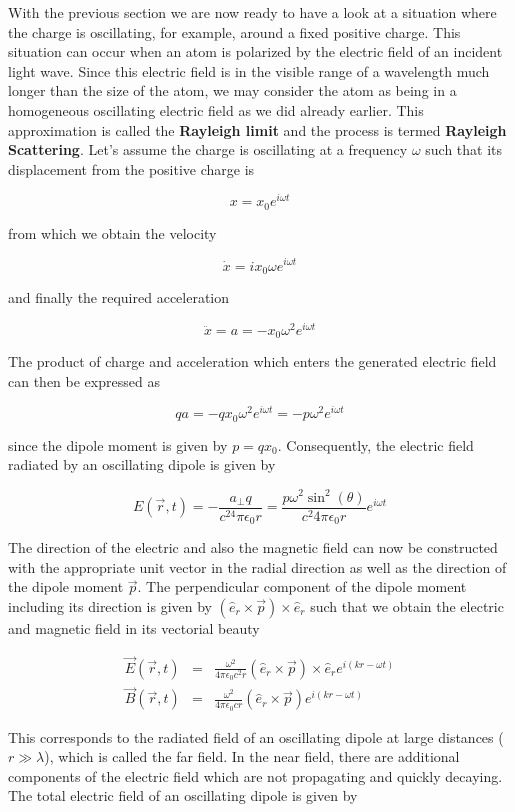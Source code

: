\documentclass[
  a4paper,
]{book}
\begin{document}
With the previous section we are now ready to have a look at a situation
where the charge is oscillating, for example, around a fixed positive
charge. This situation can occur when an atom is polarized by the
electric field of an incident light wave. Since this electric field is
in the visible range of a wavelength much longer than the size of the
atom, we may consider the atom as being in a homogeneous oscillating
electric field as we did already earlier. This approximation is called
the \textbf{Rayleigh limit} and the process is termed \textbf{Rayleigh
Scattering}. Let's assume the charge is oscillating at a frequency
\(\omega\) such that its displacement from the positive charge is

\[
x=x_0 e^{i\omega t}
\]

from which we obtain the velocity

\[
\dot{x}=ix_0 \omega e^{i\omega t}
\]

and finally the required acceleration

\[
\ddot{x}=a=-x_0 \omega^{2}e^{i\omega t}
\]

The product of charge and acceleration which enters the generated
electric field can then be expressed as

\[
q a=-q x_{0}\omega^{2}e^{i\omega t} = -p \omega^{2}e^{i\omega t}
\]

since the dipole moment is given by \(p=q x_0\). Consequently, the
electric field radiated by an oscillating dipole is given by

\[
E(\vec{r},t)=-\frac{a_{\perp} q}{c^24\pi \epsilon_0 r}=\frac{p\omega^2 \sin^2(\theta)}{c^2 4\pi\epsilon_0 r}e^{i\omega t}
\]

The direction of the electric and also the magnetic field can now be
constructed with the appropriate unit vector in the radial direction as
well as the direction of the dipole moment \(\vec{p}\). The
perpendicular component of the dipole moment including its direction is
given by \((\hat{e}_r\times \vec{p})\times \hat{e}_r\) such that we
obtain the electric and magnetic field in its vectorial beauty

\begin{eqnarray}
\vec{E}(\vec{r},t) & = &\frac{\omega^2}{4\pi \epsilon_0 c^2 r}(\hat{e}_r\times \vec{p})\times \hat{e}_r e^{i(k r - \omega t)}\\
\vec{B}(\vec{r},t) & = &\frac{\omega^2}{4\pi \epsilon_0 c r}(\hat{e}_r\times \vec{p}) e^{i(k r - \omega t)}
\end{eqnarray}

This corresponds to the radiated field of an oscillating dipole at large
distances (\(r \gg \lambda\)), which is called the far field. In the
near field, there are additional components of the electric field which
are not propagating and quickly decaying. The total electric field of an
oscillating dipole is given by
\end{document}
